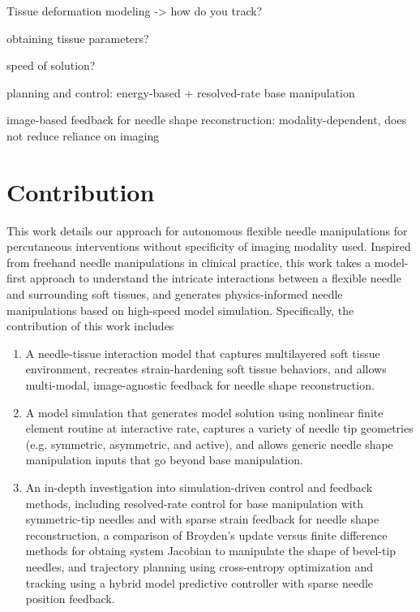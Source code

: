 \alert{Tissue deformation modeling -> how do you track?}

\alert{obtaining tissue parameters?}

\alert{speed of solution?}

\alert{planning and control: energy-based + resolved-rate base manipulation}

\alert{image-based feedback for needle shape reconstruction: modality-dependent, does not reduce reliance on imaging}

\section{Contribution}
\label{sec:contribution}

This work details our approach for autonomous flexible needle manipulations for percutaneous interventions without specificity of imaging modality used. Inspired from freehand needle manipulations in clinical practice, this work takes a model-first approach to understand the intricate interactions between a flexible needle and surrounding soft tissues, and generates physics-informed needle manipulations based on high-speed model simulation. Specifically, the contribution of this work includes
\begin{enumerate}[label*=\arabic*.]
\item A needle-tissue interaction model that captures multilayered soft tissue environment, recreates strain-hardening soft tissue behaviors, and allows multi-modal, image-agnostic feedback for needle shape reconstruction.
\item A model simulation that generates model solution using nonlinear finite element routine at interactive rate, captures a variety of needle tip geometries (e.g. symmetric, asymmetric, and active), and allows generic needle shape manipulation inputs that go beyond base manipulation.
\item An in-depth investigation into simulation-driven control and feedback methods, including resolved-rate control for base manipulation with symmetric-tip needles and with sparse strain feedback for needle shape reconstruction, a comparison of Broyden's update versus finite difference methods for obtaing system Jacobian to manipulate the shape of bevel-tip needles, and trajectory planning using cross-entropy optimization and tracking using a hybrid model predictive controller with sparse needle position feedback.
\end{enumerate}

